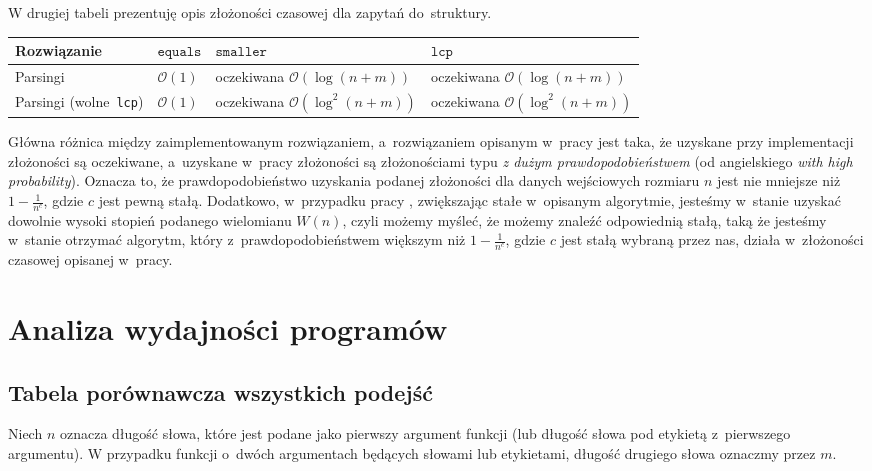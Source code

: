\documentclass[declaration,shortabstract]{iithesis}
\theoremstyle{definition} \newtheorem{definition}{Definicja}[chapter]
\theoremstyle{plain} \newtheorem{remark}[definition]{Obserwacja}
\theoremstyle{plain} \newtheorem{theorem}[definition]{Twierdzenie}
\theoremstyle{plain} \newtheorem{example}{Przykład}[definition]
\theoremstyle{plain} \newtheorem{lemma}[definition]{Lemat}
\begin{document}
W drugiej tabeli prezentuję opis złożoności czasowej dla zapytań do~struktury.

\begin{center}
    \begin{tabular}{ | m{3cm} | >{\centering\arraybackslash}m{3cm} | >{\centering\arraybackslash}m{3cm} | >{\centering\arraybackslash}m{3cm} | }
        \hline 
        Rozwiązanie & $\texttt{equals}$ & $\texttt{smaller}$ & $\texttt{lcp}$ \\
        \hline
        Parsingi & $\mathcal{O}(1)$ & oczekiwana $\mathcal{O}(\log(n + m))$ & oczekiwana $\mathcal{O}(\log(n + m))$ \\
        \hline
        Parsingi (wolne~\texttt{lcp}) & $\mathcal{O}(1)$ & oczekiwana $\mathcal{O}(\log^2(n + m))$ & oczekiwana $\mathcal{O}(\log^2(n + m))$ \\
        \hline
    \end{tabular}
\end{center}

Główna różnica między zaimplementowanym rozwiązaniem, a~rozwiązaniem opisanym w~pracy \cite{gawrychowski} jest taka, że uzyskane przy implementacji złożoności są oczekiwane, a~uzyskane w~pracy złożoności są złożonościami typu \textit{z dużym prawdopodobieństwem} (od angielskiego \textit{with high probability}). Oznacza to, że prawdopodobieństwo uzyskania podanej złożoności dla danych wejściowych rozmiaru $n$ jest nie mniejsze niż $1 - \frac{1}{n^c}$, gdzie $c$ jest pewną stałą. Dodatkowo, w~przypadku pracy \cite{gawrychowski}, zwiększając stałe w~opisanym algorytmie, jesteśmy w~stanie uzyskać dowolnie wysoki stopień podanego wielomianu $W(n)$, czyli możemy myśleć, że możemy znaleźć odpowiednią stałą, taką że jesteśmy w~stanie otrzymać algorytm, który z~prawdopodobieństwem większym niż $1 - \frac{1}{n^c}$, gdzie $c$ jest stałą wybraną przez nas, działa w~złożoności czasowej opisanej w~pracy.

\chapter{Analiza wydajności programów}

\section{Tabela porównawcza wszystkich podejść}

Niech $n$ oznacza długość słowa, które jest podane jako pierwszy argument funkcji (lub długość słowa pod etykietą z~pierwszego argumentu). W przypadku funkcji o~dwóch argumentach będących słowami lub etykietami, długość drugiego słowa oznaczmy przez $m$.
\end{document}
